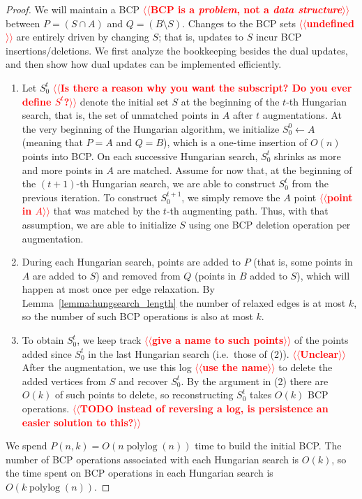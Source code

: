 \documentclass[11pt]{article}
\makeatletter
\def\polylog{\mathop{\mathrm{polylog}}}
\theoremstyle{plain}
\numberwithin{figure}{section}
\def\n@te#1{\textsf{\boldmath \textbf{$\langle\!\langle$#1$\rangle\!\rangle$}}\leavevmode}
\def\note#1{\textcolor{red}{\n@te{#1}}}
\makeatother
\begin{document}
\begin{proof}
We will maintain a BCP \note{BCP is a \emph{problem}, not a \emph{data structure}} between $P = (S \cap A)$ and
$Q = (B \setminus S)$.
Changes to the BCP sets \note{undefined} are entirely driven by changing $S$; that is, updates to $S$ incur BCP insertions/deletions.
We first analyze the bookkeeping besides the dual updates, and then
show how dual updates can be implemented efficiently.

\begin{enumerate}
\item Let $S^t_0$ \note{Is there a reason why you want the subscript?  Do you ever define $S^t$?} denote the initial set $S$ at the beginning of the
	$t$-th Hungarian search, that is, the set of unmatched points in $A$
	after $t$ augmentations.
	At the very beginning of the Hungarian algorithm, we initialize
	$S^0_0 \gets A$ (meaning that $P = A$ and $Q = B$), which is a
	one-time insertion of $O(n)$ points into BCP.
	On each successive Hungarian search, $S^t_0$ shrinks as more
	and more points in $A$ are matched.
	Assume for now that, at the beginning of the $(t+1)$-th
	Hungarian search, we are able to construct $S^t_0$ from the
	previous iteration.
	To construct $S^{t+1}_0$, we simply remove the $A$ point \note{point in $A$} that
	was matched by the $t$-th augmenting path.
	Thus, with that assumption, we are able to initialize $S$ using
	one BCP deletion operation per augmentation.

\item During each Hungarian search, points are added to $P$ (that is, some points in $A$ are
	added to $S$) and removed from $Q$ (points in $B$ added to $S$), which will happen at most once per edge relaxation.
	By Lemma~\ref{lemma:hungsearch_length} the number of relaxed
	edges is at most $k$, so the number of such BCP operations is
	also at most $k$.

\item To obtain $S^t_0$, we keep track \note{give a name to such points} of the
	points added since $S^t_0$ in the last Hungarian search
	(i.e.\ those of (2)). \note{Unclear}
	After the augmentation, we use this log \note{use the name} to delete the added
	vertices from $S$ and recover $S^t_0$.
	By the argument in (2) there are $O(k)$ of such points to
	delete, so reconstructing $S^t_0$ takes $O(k)$ BCP operations.
	\note{TODO instead of reversing a log, is persistence an easier solution to this?}
\end{enumerate}

We spend $P(n, k) = O(n \polylog(n))$ time to build
the initial BCP.
The number of BCP operations associated with each Hungarian search is
$O(k)$, so the time spent on BCP operations in each Hungarian search
is $O(k \polylog(n))$.


\end{proof}
\end{document}
